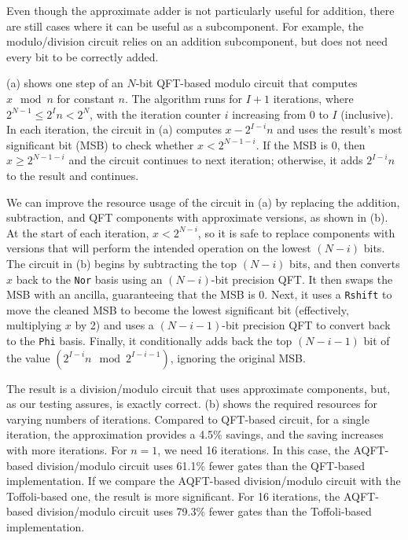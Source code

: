 Even though the approximate adder is not particularly useful for addition, there are still cases where it can be useful as a subcomponent. 
For example, the modulo/division circuit relies on an addition subcomponent, but does not need every bit to be correctly added.

(a) shows one step of an $N$-bit QFT-based modulo circuit that computes $x\!\!\mod n$ for constant $n$.
The algorithm runs for $I+1$ iterations, where $2^{N-1} \le 2^I n <2^N$, with the iteration counter $i$ increasing from 0 to $I$ (inclusive).
In each iteration, the circuit in (a) computes $x-2^{I-i} n$ and uses the result's most significant bit (MSB) to check whether $x < 2^{N-1-i}$.
If the MSB is $0$, then $x \ge 2^{N-1-i}$ and the circuit continues to next iteration; otherwise, it adds $2^{I-i} n$ to the result and continues.

We can improve the resource usage of the circuit in (a) by replacing the addition, subtraction, and QFT components with approximate versions, as shown in (b).
At the start of each iteration, $x < 2^{N-i}$, so it is safe to replace components with versions that will perform the intended operation on the lowest $(N-i)$ bits.
The circuit in (b) begins by subtracting the top $(N-i)$ bits, and then converts $x$ back to the \texttt{Nor} basis using an $(N-i)$-bit precision QFT\@.
It then swaps the MSB with an ancilla, guaranteeing that the MSB is 0. 
Next, it uses a \texttt{Rshift} to move the cleaned MSB to become the lowest significant bit (effectively, multiplying $x$ by 2) and uses a $(N-i-1)$-bit precision QFT to convert back to the \texttt{Phi} basis.
Finally, it conditionally adds back the top $(N-i-1)$ bit of the value $(2^{I-i} n \!\mod 2^{I-i-1})$, ignoring the original MSB.

The result is a division/modulo circuit that uses approximate components, but, as our testing assures, is exactly correct.
(b) shows the required resources for varying numbers of iterations.
Compared to QFT-based circuit,
for a single iteration, the approximation provides a 4.5\% savings, and the saving increases with more iterations.
For $n = 1$, we need 16 iterations. In this case, the AQFT-based division/modulo circuit uses 61.1\% fewer gates than the QFT-based implementation.
If we compare the AQFT-based division/modulo circuit with the Toffoli-based one, the result is more significant. For 16 iterations, the AQFT-based division/modulo circuit uses 79.3\% fewer gates than the Toffoli-based implementation.

